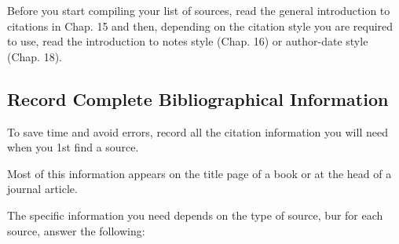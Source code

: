 \documentclass[oneside]{book}
\numberwithin{equation}{section}
\begin{document}
Before you start compiling your list of sources, read the general introduction to citations in Chap. 15 and then, depending on the citation style you are required to use, read the introduction to notes style (Chap. 16) or author-date style (Chap. 18).

\subsection{Record Complete Bibliographical Information}
To save time and avoid errors, record all the citation information you will need when you 1st find a source.

Most of this information appears on the title page of a book or at the head of a journal article.

The specific information you need depends on the type of source, bur for each source, answer the following:
\end{document}
